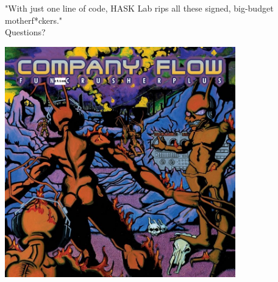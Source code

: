 \documentclass{beamer}
\begin{document}
\begin{frame}{"With just one line of code, HASK Lab rips all these signed, big-budget motherf*ckers."\\ Questions?}

\includegraphics[width=10cm]{funcrusher.jpg}

\end{frame}




\end{document}
